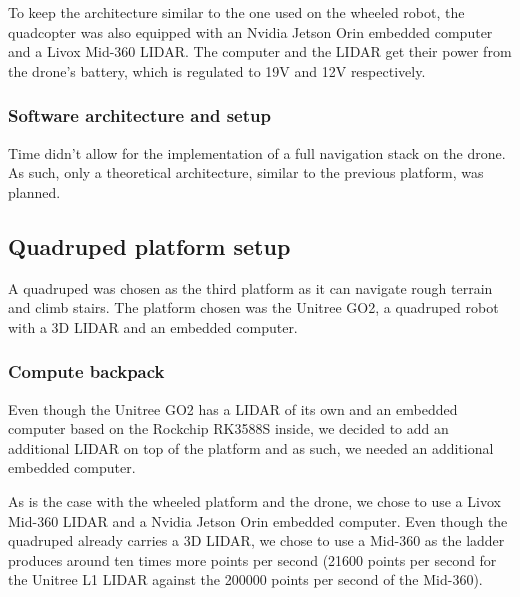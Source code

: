 \documentclass[11pt]{article}
\begin{document}
                To keep the architecture similar to the one used on the wheeled robot, the quadcopter was also equipped with an Nvidia Jetson Orin embedded computer and a Livox Mid-360 LIDAR. The computer and the LIDAR get their power from the drone's battery, which is regulated to 19V and 12V respectively.

            \subsubsection{Software architecture and setup}
                
                Time didn't allow for the implementation of a full navigation stack on the drone. As such, only a theoretical architecture, similar to the previous platform, was planned.
        
            
    \subsection{Quadruped platform setup}

        A quadruped was chosen as the third platform as it can navigate rough terrain and climb stairs. The platform chosen was the Unitree GO2, a quadruped robot with a 3D LIDAR and an embedded computer.

        \subsubsection{Compute backpack}

        Even though the Unitree GO2 has a LIDAR of its own and an embedded computer based on the Rockchip RK3588S inside, we decided to add an additional LIDAR on top of the platform and as such, we needed an additional embedded computer.

        As is the case with the wheeled platform and the drone, we chose to use a Livox Mid-360 LIDAR and a Nvidia Jetson Orin embedded computer. Even though the quadruped already carries a 3D LIDAR, we chose to use a Mid-360 as the ladder produces around ten times more points per second (21600 points per second for the Unitree L1 LIDAR against the 200000 points per second of the Mid-360).
\end{document}
